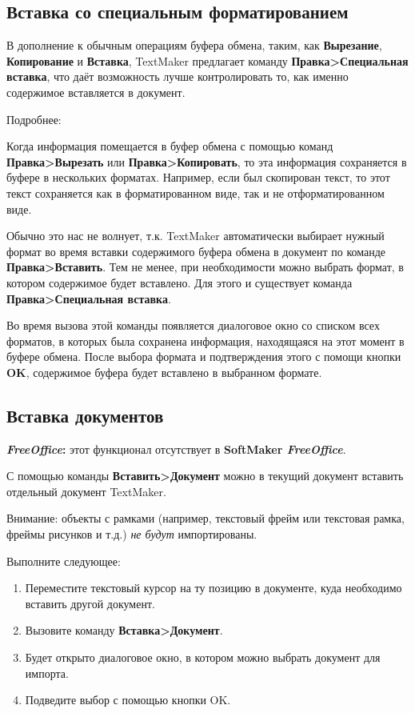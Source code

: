 ﻿\documentclass[a4paper,10pt]{article}
\begin{document}
\subsection{Вставка со специальным форматированием}
В дополнение к обычным операциям буфера обмена, таким, как \textbf{Вырезание}, \textbf{Копирование} и \textbf{Вставка}, TextMaker предлагает команду \textbf{Правка>Специальная вставка}, что даёт возможность лучше контролировать то, как именно содержимое вставляется в документ.

Подробнее:

Когда информация помещается в буфер обмена с помощью команд \textbf{Правка>Вырезать} или \textbf{Правка>Копировать}, то эта информация сохраняется в буфере в нескольких форматах. Например, если был скопирован текст, то этот текст сохраняется как в форматированном виде, так и не отформатированном виде.

Обычно это нас не волнует, т.к. TextMaker автоматически выбирает нужный формат во время вставки содержимого буфера обмена в документ по команде \textbf{Правка>Вставить}. Тем не менее, при необходимости можно выбрать формат, в котором содержимое будет вставлено. Для этого и существует команда \textbf{Правка>Специальная вставка}.

Во время вызова этой команды появляется диалоговое окно со списком всех форматов, в которых была сохранена информация, находящаяся на этот момент в буфере обмена. После выбора формата и подтверждения этого с помощи кнопки \textbf{OK}, содержимое буфера будет вставлено в выбранном формате.

\subsection{Вставка документов}
\begin{mdframed}[backgroundcolor=pink!50]
\textbf{\textit{FreeOffice}:} этот функционал отсутствует в \textbf{SoftMaker \textit{FreeOffice}}.
\end{mdframed}

С помощью команды \textbf{Вставить>Документ} можно в текущий документ вставить отдельный документ TextMaker.

Внимание: объекты с рамками (например, текстовый фрейм или текстовая рамка, фреймы рисунков и т.д.) \textit{не будут} импортированы.

Выполните следующее:
\begin{enumerate}
 \item Переместите текстовый курсор на ту позицию в документе, куда необходимо вставить другой документ.
 \item Вызовите команду \textbf{Вставка>Документ}.
 \item Будет открыто диалоговое окно, в котором можно выбрать документ для импорта.
 \item Подведите выбор с помощью кнопки OK.
\end{enumerate}
\end{document}
